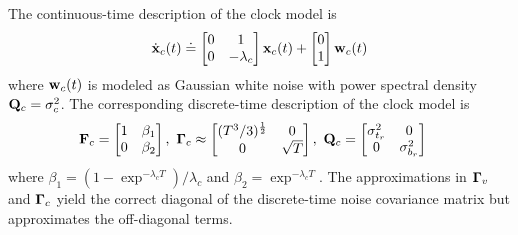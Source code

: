 The continuous-time description of the clock model is 
\begin{align}
	\dot{\mathbf{x}}_c(t) \doteq 
	\begin{bmatrix}
		0 & 1 \\ 0 & -\lambda_c
	\end{bmatrix} 
	\mathbf{x}_c(t) +
	\begin{bmatrix} 0 \\ 1 \end{bmatrix} \mathbf{w}_c(t)
\end{align}
where $\mathbf{w}_c(t)$ is modeled as Gaussian white noise with power spectral density $\mathbf{Q}_c = \sigma_c^2$. 
The corresponding discrete-time description of the clock model is 
\begin{align}
	& \mathbf{F}_c = 
	\begin{bmatrix}
		1 & \beta_1 \\ 0 & \beta_2
	\end{bmatrix}, ~
	\boldsymbol{\Gamma}_c \approx
	\begin{bmatrix}
		(T^3 / 3)^{\frac{1}{2}} & 0 \\
		0 & \sqrt{T}
	\end{bmatrix}, ~  
	\mathbf{Q}_{c} = 
	\begin{bmatrix}
		\sigma_{t_r}^2 & 0 \\ 0 & \sigma_{b_r}^2
	\end{bmatrix}
\end{align}
where $\beta_1 = (1 - \exp^{-\lambda_c T})/ \lambda_c$ and $\beta_2 = \exp^{-\lambda_c T}$.
The approximations in $\boldsymbol{\Gamma}_v$ and $\boldsymbol{\Gamma}_c$ yield the correct diagonal of the discrete-time noise covariance matrix but approximates the off-diagonal terms.